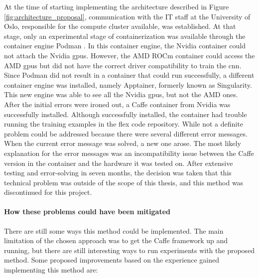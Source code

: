             At the time of starting implementing the architecture described in Figure \ref{fig:architecture_proposal}, communication with the IT staff at the University of Oslo, responsible for the compute cluster available, was established. At that stage, only an experimental stage of containerization was available through the container engine Podman \cite{Podman}. In this container engine, the Nvidia container could not attach the Nvidia \glspl{gpu}. However, the AMD ROCm container could access the AMD \glspl{gpu} but did not have the correct driver compatibility to train the \gls{cnn}. Since Podman did not result in a container that could run successfully, a different container engine was installed, namely Apptainer, formerly known as Singularity. This new engine was able to see all the Nvidia \glspl{gpu}, but not the AMD ones. After the initial errors were ironed out, a Caffe container from Nvidia was successfully installed. Although successfully installed, the container had trouble running the training examples in the \gls{flex} code repository. While not a definite problem could be addressed because there were several different error messages. When the current error message was solved, a new one arose. The most likely explanation for the error messages was an incompatibility issue between the Caffe version in the container and the hardware it was tested on. After extensive testing and error-solving in seven months, the decision was taken that this technical problem was outside of the scope of this thesis, and this method was discontinued for this project. 
            

            
            \paragraph{How these problems could have been mitigated\\}

            There are still some ways this method could be implemented. The main limitation of the chosen approach was to get the Caffe framework up and running, but there are still interesting ways to run experiments with the proposed method. Some proposed improvements based on the experience gained implementing this method are:

